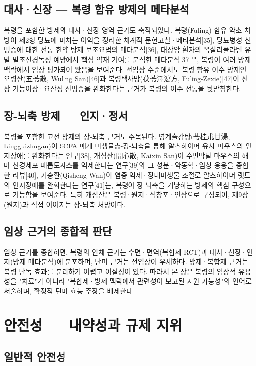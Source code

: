 \documentclass[12pt,oneside]{book}
\begin{document}
\subsection{대사·신장 — 복령 함유 방제의 메타분석}

복령을 포함한 방제의 대사·신장 영역 근거도 축적되었다. 복령(Fuling) 함유 약초 처방이 제2형 당뇨에 미치는 이익을 정리한 체계적 문헌고찰·메타분석[35], 당뇨병성 신병증에 대한 전통 한약 탕제 보조요법의 메타분석[36], 대장암 환자의 옥살리플라틴 유발 말초신경독성 예방에서 핵심 약재 기여를 분석한 메타분석[37]은, 복령이 여러 방제 맥락에서 임상 평가되어 왔음을 보여준다. 전임상 수준에서도 복령 함유 이수 방제인 오령산(五苓散, Wuling San)[46]과 복령택사방(茯苓澤瀉方, Fuling-Zexie)[47]이 신장 기능이상·요산성 신병증을 완화한다는 근거가 복령의 이수 전통을 뒷받침한다.

\subsection{장-뇌축 방제 — 인지·정서}

복령을 포함한 고전 방제의 장-뇌축 근거도 주목된다. 영계출감탕(苓桂朮甘湯, Lingguizhugan)이 SCFA 매개 미생물총-장-뇌축을 통해 알츠하이머 유사 마우스의 인지장애를 완화한다는 연구[38], 개심산(開心散, Kaixin San)이 수면박탈 마우스의 해마 신경세포 페롭토시스를 억제한다는 연구[39]와 그 성분·약동학·임상 응용을 종합한 리뷰[40], 기승환(Qisheng Wan)이 염증 억제·장내미생물 조절로 알츠하이머 랫트의 인지장애를 완화한다는 연구[41]는, 복령이 장-뇌축을 겨냥하는 방제의 핵심 구성으로 기능함을 보여준다. 특히 개심산은 복령·원지·석창포·인삼으로 구성되어, 제9장(원지)과 직접 이어지는 장-뇌축 처방이다.

\subsection{임상 근거의 종합적 판단}

임상 근거를 종합하면, 복령의 인체 근거는 수면·면역(복합제 RCT)과 대사·신장·인지(방제 메타분석)에 분포하며, 단미 근거는 전임상이 우세하다. 방제·복합제 근거는 복령 단독 효과를 분리하기 어렵고 이질성이 있다. 따라서 본 장은 복령의 임상적 유용성을 "치료"가 아니라 "복합제·방제 맥락에서 관련성이 보고된 지원 가능성"의 언어로 서술하며, 확정적 단미 효능 주장을 배제한다.

\section{안전성 — 내약성과 규제 지위}

\subsection{일반적 안전성}
\end{document}
